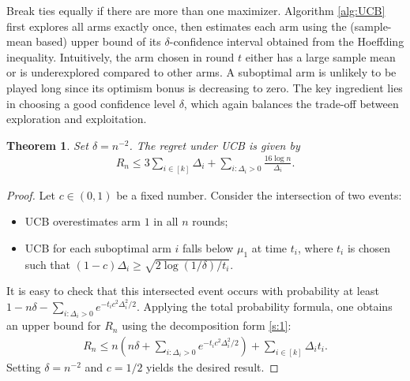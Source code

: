 \documentclass[10pt,a4article]{amsart}
\numberwithin{equation}{section}
\theoremstyle{plain}
\newtheorem{Th}{Theorem}
\theoremstyle{definition}
\begin{document}
Break ties equally if there are more than one maximizer. Algorithm \ref{alg:UCB} first explores all arms exactly once, then estimates each arm using the (sample-mean based) upper bound of its $\delta$-confidence interval obtained from the Hoeffding inequality. Intuitively, the arm chosen in round $t$ either has a large sample mean or is underexplored compared to other arms. A suboptimal arm is unlikely to be played long since its optimism bonus is decreasing to zero. The key ingredient lies in choosing a good confidence level $\delta$, which again balances the trade-off between exploration and exploitation.  
\begin{Th}\label{thm:UCB}
Set $\delta=n^{-2}$. The regret under UCB is given by
\begin{align*}
R_n\leq 3\sum_{i\in [k]}\Delta_i +\sum_{i: \Delta_i>0}\frac{16\log n}{\Delta_i}.
\end{align*}
\end{Th}
\begin{proof}
Let $c\in (0,1)$ be a fixed number. Consider the intersection of two events: 
\begin{itemize}
\item UCB overestimates arm $1$ in all $n$ rounds; 
\item UCB for each suboptimal arm $i$ falls below $\mu_1$ at time $t_i$, where $t_i$ is chosen such that $(1-c)\Delta_i\geq\sqrt{2\log(1/\delta)/t_i}$. 
\end{itemize}
It is easy to check that this intersected event occurs with probability at least $1-n\delta-\sum_{i: \Delta_i>0}e^{-t_ic^2\Delta^2_i/2}$. Applying the total probability formula, one obtains an upper bound for $R_n$ using the decomposition form \eqref{s:1}:
\begin{align*}
R_n\leq n\left(n\delta+\sum_{i: \Delta_i>0}e^{-t_ic^2\Delta^2_i/2}\right)+\sum_{i\in [k]}\Delta_i t_i.
\end{align*}
Setting $\delta=n^{-2}$ and $c=1/2$ yields the desired result.   
\end{proof}
\end{document}
